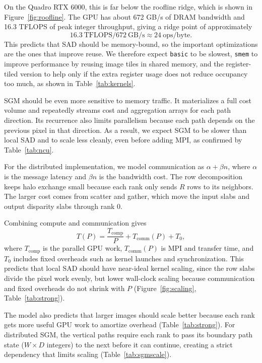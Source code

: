 \documentclass[11pt]{article}
\begin{document}
On the Quadro RTX 6000, this is far below the roofline ridge, which is shown in Figure~\ref{fig:roofline}. The GPU has about
672 GB/s of DRAM bandwidth and 16.3 TFLOPS of peak integer throughput, giving a
ridge point of approximately
\[
16.3\ \text{TFLOPS} / 672\ \text{GB/s} \approx 24\ \text{ops/byte}.
\]
This predicts that SAD should be memory-bound, so the important optimizations
are the ones that improve reuse. We therefore expect \texttt{basic} to be
slowest, \texttt{smem} to improve performance by reusing image tiles in shared
memory, and the register-tiled version to help only if the extra register usage
does not reduce occupancy too much, as shown in Table~\ref{tab:kernels}.

SGM should be even more sensitive to memory traffic. It materializes a full cost
volume and repeatedly streams cost and aggregation arrays for each path
direction. Its recurrence also limits parallelism because each path depends on
the previous pixel in that direction. As a result, we expect SGM to be slower
than local SAD and to scale less cleanly, even before adding MPI, as confirmed by Table~\ref{tab:ncu}.

For the distributed implementation, we model communication as
$\alpha+\beta n$, where $\alpha$ is the message latency and $\beta n$ is the
bandwidth cost. The row decomposition keeps halo exchange small because each
rank only sends $R$ rows to its neighbors. The larger cost comes from scatter and
gather, which move the input slabs and output disparity slabs through rank 0.

Combining compute and communication gives
\[
T(P) = \frac{T_{\mathrm{comp}}}{P} + T_{\mathrm{comm}}(P) + T_0,
\]
where $T_{\mathrm{comp}}$ is the parallel GPU work, $T_{\mathrm{comm}}(P)$ is
MPI and transfer time, and $T_0$ includes fixed overheads such as kernel launches
and synchronization. This predicts that local SAD should have near-ideal kernel
scaling, since the row slabs divide the pixel work evenly, but lower wall-clock
scaling because communication and fixed overheads do not shrink with $P$
(Figure~\ref{fig:scaling}, Table~\ref{tab:strong}).

The model also predicts that larger images should scale better because each rank
gets more useful GPU work to amortize overhead (Table~\ref{tab:strong}). For distributed SGM, the vertical paths require each rank to pass its boundary path state ($W\times D$ integers) to the next before it can continue, creating a strict dependency that limits scaling (Table~\ref{tab:sgmscale}).
\end{document}
